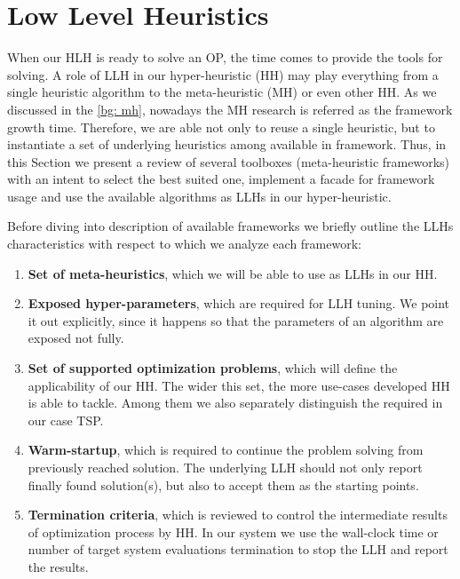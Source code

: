\section{Low Level Heuristics}\label{impl: LLH}
When our HLH is ready to solve an OP, the time comes to provide the tools for solving. A role of LLH in our hyper-heuristic (HH) may play everything from a single heuristic algorithm to the meta-heuristic (MH) or even other HH. As we discussed in the \cref{bg: mh}, nowadays the MH research is referred as the framework growth time. Therefore, we are able not only to reuse a single heuristic, but to instantiate a set of underlying heuristics among available in framework. Thus, in this Section we present a review of several toolboxes (meta-heuristic frameworks) with an intent to select the best suited one, implement a facade for framework usage and use the available algorithms as LLHs in our hyper-heuristic.

Before diving into description of available frameworks we briefly outline the LLHs characteristics with respect to which we analyze each framework:
\begin{enumerate}
	\item \textbf{Set of meta-heuristics}, which we will be able to use as LLHs in our HH.
	
	\item \textbf{Exposed hyper-parameters}, which are required for LLH tuning. We point it out explicitly, since it happens so that the parameters of an algorithm are exposed not fully.
	
	\item \textbf{Set of supported optimization problems}, which will define the applicability of our HH. The wider this set, the more use-cases developed HH is able to tackle. Among them we also separately distinguish the required in our case TSP.
	
	\item \textbf{Warm-startup}, which is required to continue the problem solving from previously reached solution. The underlying LLH should not only report finally found solution(s), but also to accept them as the starting points.
	
	\item \textbf{Termination criteria}, which is reviewed to control the intermediate results of optimization process by HH. In our system we use the wall-clock time or number of target system evaluations termination to stop the LLH and report the results.
\end{enumerate}


